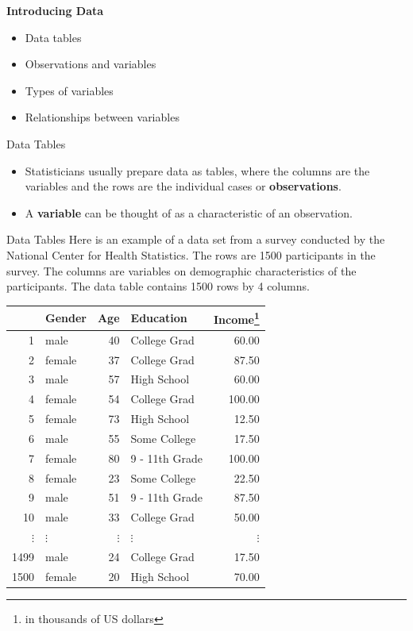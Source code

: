\documentclass[10pt]{beamer}
\begin{document}
\begin{frame}
\large \textbf{Introducing Data}
\begin{itemize}
\item Data tables
\item Observations and variables
\item Types of variables
\item Relationships between variables
\end{itemize}
\end{frame}

\begin{frame}{Data Tables}
\begin{itemize}
\item Statisticians usually prepare data as tables, where the columns are the variables and the rows are the individual cases or \textbf{observations}.
\vspace{10pt}
\item A \textbf{variable} can be thought of as a characteristic of an observation.
\end{itemize}
\end{frame}

\begin{frame}[fragile]{Data Tables}
Here is an example of a data set from a survey conducted by the National Center for Health Statistics.  The rows are 1500 participants in the survey.  The columns are variables on demographic characteristics of the participants.  The data table contains 1500 rows by 4 columns.

\small
\begin{table}[ht]
\centering
\begin{tabular}{rlrlr}
  \hline
 & Gender & Age & Education & Income\footnote{in thousands of US dollars}\\ 
  \hline
1 & male &  40 & College Grad & 60.00 \\ 
  2 & female &  37 & College Grad & 87.50 \\ 
  3 & male &  57 & High School & 60.00 \\ 
  4 & female &  54 & College Grad & 100.00 \\ 
  5 & female &  73 & High School & 12.50 \\ 
  6 & male &  55 & Some College & 17.50 \\ 
  7 & female &  80 & 9 - 11th Grade & 100.00 \\ 
  8 & female &  23 & Some College & 22.50 \\ 
  9 & male &  51 & 9 - 11th Grade & 87.50 \\ 
  10 & male &  33 & College Grad & 50.00 \\
  $\vdots$ & $\vdots$ &  $\vdots$ & $\vdots$ & $\vdots$ \\
  1499 & male &  24 & College Grad & 17.50 \\ 
  1500 & female &  20 & High School & 70.00 \\ 
   \hline
\end{tabular}
\end{table}
\end{frame}
\end{document}
